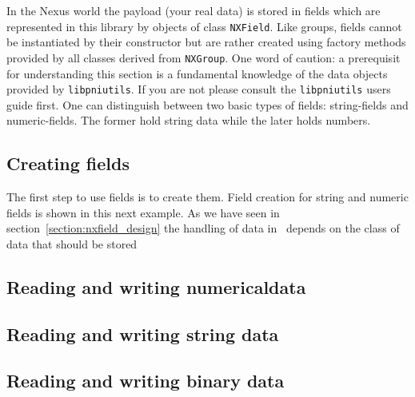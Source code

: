 
In the Nexus world the payload (your real data) is stored in fields which 
are represented in this library by objects of class {\tt NXField}.
Like groups, fields cannot be instantiated by their constructor but are 
rather created using factory methods provided by all classes derived 
from  {\tt NXGroup}. One word of caution: a prerequisit for understanding 
this section is a fundamental knowledge of the data objects provided 
by {\tt libpniutils}. If you are not please consult the {\tt libpniutils}
users guide first.
One can distinguish between two basic types of fields: string-fields
and numeric-fields. The former hold string data while the later 
holds numbers.   

\subsection{Creating fields}

The first step to use fields is to create them. Field creation for 
string and numeric fields is shown in this next example. 
As we have seen in section~\ref{section:nxfield_design} the handling 
of data in \nxfield\ depends on the class of data that should be stored 




\subsection{Reading and writing numericaldata}
\label{section:nxfield_numeric_io}

\subsection{Reading and writing string data}
\label{section:nxfield_string_io}

\subsection{Reading and writing binary data}
\label{section:nxfield_binary_io}
